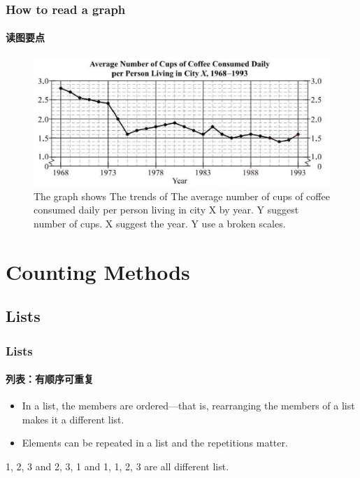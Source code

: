 \documentclass[
	11pt, %
	handout,
]{beamer}
\begin{document}
\begin{frame}
	\frametitle{How to read a graph} %
	\framesubtitle{读图要点}
	\begin{figure}
		\includegraphics[width=0.8\linewidth]{Graph.png}
		\caption{The graph shows The trends of The average number of cups of coffee consumed daily
per person living in city X by year. Y suggest number of cups. X suggest the year. Y use a broken scales.}
	\end{figure}
\end{frame}


\section{Counting Methods}


\subsection{Lists}
\begin{frame}
	\frametitle{Lists} %
	\framesubtitle{列表：有顺序可重复}
	\begin{definition}
		\begin{itemize}
			\item In a list, the members are ordered—that is, rearranging the members of a list makes it a different list.
			\item Elements can be repeated in a list and the repetitions matter.
		\end{itemize}
	\end{definition}
	\begin{example}
		1, 2, 3 and 2, 3, 1 and 1, 1, 2, 3 are all different list. 
	\end{example}
\end{frame}
\end{document}
